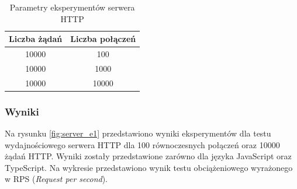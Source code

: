 \begin{table}[H]
  \centering
  \caption{Parametry eksperymentów serwera HTTP}
  \begin{tabular}{|c|c|}
    \hline
    \textbf{Liczba żądań} & \textbf{Liczba połączeń}\\ \hline
    10000 & 100 \\ \hline
    10000 & 1000 \\ \hline
    10000 & 10000 \\ \hline
  \end{tabular}
  \label{tab:http_experiments}
\end{table}

\subsubsection{Wyniki}
Na rysunku \ref{fig:server_e1} przedstawiono wyniki eksperymentów dla testu wydajnościowego serwera HTTP dla 100 równoczesnych połączeń oraz 10000 żądań HTTP. Wyniki zostały przedstawione zarówno dla języka JavaScript oraz TypeScript. Na wykresie przedstawiono wynik testu obciążeniowego wyrażonego w RPS (\textit{Request per second}).

